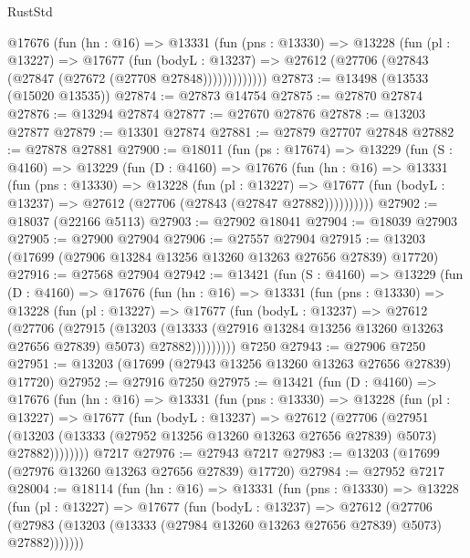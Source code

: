 \begin{lexlean}{RustStd}
\begin{coremodule}
          @17676
            (fun (hn : @16) =>
            @13331
              (fun (pns : @13330) =>
              @13228
                (fun (pl : @13227) =>
                @17677
                  (fun (bodyL : @13237) =>
                  @27612 (@27706 (@27843 (@27847 (@27672 (@27708 @27848)))))))))))))
@27873 := @13498 (@13533 (@15020 @13535))
@27874 := @27873 @14754
@27875 := @27870 @27874
@27876 := @13294 @27874
@27877 := @27670 @27876
@27878 := @13203 @27877
@27879 := @13301 @27874
@27881 := @27879 @27707 @27848
@27882 := @27878 @27881
@27900 := @18011
    (fun (ps : @17674) =>
    @13229
      (fun (S : @4160) =>
      @13229
        (fun (D : @4160) =>
        @17676
          (fun (hn : @16) =>
          @13331
            (fun (pns : @13330) =>
            @13228
              (fun (pl : @13227) =>
              @17677 (fun (bodyL : @13237) => @27612 (@27706 (@27843 (@27847 @27882))))))))))
@27902 := @18037 (@22166 @5113)
@27903 := @27902 @18041
@27904 := @18039 @27903
@27905 := @27900 @27904
@27906 := @27557 @27904
@27915 := @13203 (@17699 (@27906 @13284 @13256 @13260 @13263 @27656 @27839) @17720)
@27916 := @27568 @27904
@27942 := @13421
    (fun (S : @4160) =>
    @13229
      (fun (D : @4160) =>
      @17676
        (fun (hn : @16) =>
        @13331
          (fun (pns : @13330) =>
          @13228
            (fun (pl : @13227) =>
            @17677
              (fun (bodyL : @13237) =>
              @27612
                (@27706
                  (@27915
                    (@13203
                      (@13333 (@27916 @13284 @13256 @13260 @13263 @27656 @27839) @5073)
                      @27882)))))))))
    @7250
@27943 := @27906 @7250
@27951 := @13203 (@17699 (@27943 @13256 @13260 @13263 @27656 @27839) @17720)
@27952 := @27916 @7250
@27975 := @13421
    (fun (D : @4160) =>
    @17676
      (fun (hn : @16) =>
      @13331
        (fun (pns : @13330) =>
        @13228
          (fun (pl : @13227) =>
          @17677
            (fun (bodyL : @13237) =>
            @27612
              (@27706
                (@27951
                  (@13203 (@13333 (@27952 @13256 @13260 @13263 @27656 @27839) @5073) @27882))))))))
    @7217
@27976 := @27943 @7217
@27983 := @13203 (@17699 (@27976 @13260 @13263 @27656 @27839) @17720)
@27984 := @27952 @7217
@28004 := @18114
    (fun (hn : @16) =>
    @13331
      (fun (pns : @13330) =>
      @13228
        (fun (pl : @13227) =>
        @17677
          (fun (bodyL : @13237) =>
          @27612
            (@27706
              (@27983 (@13203 (@13333 (@27984 @13260 @13263 @27656 @27839) @5073) @27882)))))))

\end{coremodule}
\end{lexlean}
